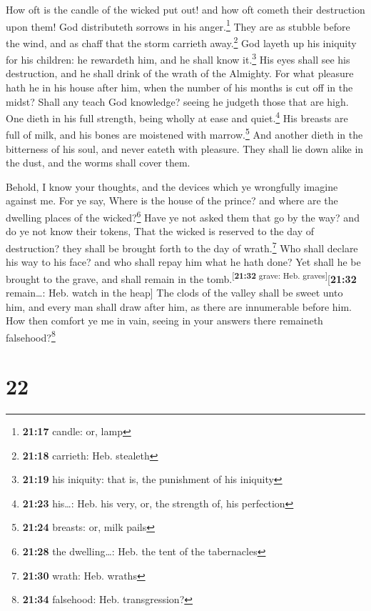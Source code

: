  How oft is the candle of the wicked put out! and how oft
cometh their destruction upon them! God distributeth sorrows in his
anger.\footnote{\textbf{21:17} candle: or, lamp}  They
are as stubble before the wind, and as chaff that the storm carrieth
away.\footnote{\textbf{21:18} carrieth: Heb. stealeth} 
God layeth up his iniquity for his children: he rewardeth him, and he
shall know it.\footnote{\textbf{21:19} his iniquity: that is, the
  punishment of his iniquity}  His eyes shall see his
destruction, and he shall drink of the wrath of the Almighty.
 For what pleasure hath he in his house after him, when
the number of his months is cut off in the midst?  Shall
any teach God knowledge? seeing he judgeth those that are high.
 One dieth in his full strength, being wholly at ease and
quiet.\footnote{\textbf{21:23} his\ldots: Heb. his very, or, the
  strength of, his perfection}  His breasts are full of
milk, and his bones are moistened with marrow.\footnote{\textbf{21:24}
  breasts: or, milk pails}  And another dieth in the
bitterness of his soul, and never eateth with pleasure. 
They shall lie down alike in the dust, and the worms shall cover them.

 Behold, I know your thoughts, and the devices which ye
wrongfully imagine against me.  For ye say, Where is the
house of the prince? and where are the dwelling places of the
wicked?\footnote{\textbf{21:28} the dwelling\ldots: Heb. the tent of the
  tabernacles}  Have ye not asked them that go by the
way? and do ye not know their tokens,  That the wicked is
reserved to the day of destruction? they shall be brought forth to the
day of wrath.\footnote{\textbf{21:30} wrath: Heb. wraths}
 Who shall declare his way to his face? and who shall
repay him what he hath done?  Yet shall he be brought to
the grave, and shall remain in the
tomb.\textsuperscript{{[}\textbf{21:32} grave: Heb.
graves{]}}{[}\textbf{21:32} remain\ldots: Heb. watch in the heap{]}
 The clods of the valley shall be sweet unto him, and
every man shall draw after him, as there are innumerable before him.
 How then comfort ye me in vain, seeing in your answers
there remaineth falsehood?\footnote{\textbf{21:34} falsehood: Heb.
  transgression?}

\hypertarget{section-21}{%
\section{22}\label{section-21}}

